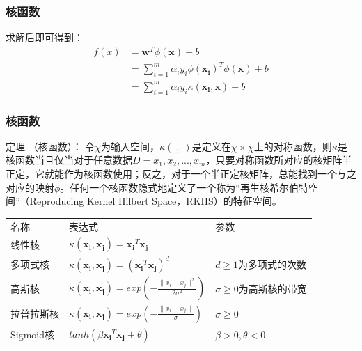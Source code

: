 \begin{frame}

\frametitle{核函数}

求解后即可得到：
\begin{align*}
f(x)&=\boldsymbol{w}^T\phi(\boldsymbol{x})+b\\
&=\sum_{i=1}^m\alpha_i y_i \phi(\boldsymbol{x_i})^T\phi(\boldsymbol{x})+b\\
&= \sum_{i=1}^m\alpha_i y_i \kappa(\boldsymbol{x_i, x}) + b
\end{align*}
\end{frame}


\begin{frame}

\frametitle{核函数}

定理 （核函数）：
令$\chi$为输入空间，$\kappa(\cdot,\cdot)$是定义在$\chi\times\chi$上的对称函数，则$\kappa$是核函数当且仅当对于任意数据$D={x_1,x_2,...,x_m}$，只要对称函数所对应的核矩阵半正定，它就能作为核函数使用；反之，对于一个半正定核矩阵，总能找到一个与之对应的映射$\phi$。任何一个核函数隐式地定义了一个称为“再生核希尔伯特空间”（Reproducing Kernel Hilbert Space，RKHS）的特征空间。

 \begin{table}[ht]

\begin{tabular}{l|l|l}

名称 & 表达式 & 参数\\  
线性核 &$\kappa(\boldsymbol{x_i,x_j})=\boldsymbol{x_i}^T\boldsymbol{x_j}$ &  \\ 
多项式核 &$\kappa(\boldsymbol{x_i,x_j})=(\boldsymbol{x_i}^T\boldsymbol{x_j})^d$ & $d\ge1$为多项式的次数 \\  
高斯核 & $\kappa(\boldsymbol{x_i,x_j})=exp(-\frac{\lVert x_i-x_j\rVert^2}{2\sigma^2})$ & $\sigma\ge0$为高斯核的带宽 \\  
拉普拉斯核 &  $\kappa(\boldsymbol{x_i,x_j})=exp(-\frac{\lVert x_i-x_j\rVert}{\sigma})$ &$\sigma\ge0$ \\  
Sigmoid核&$tanh(\beta\boldsymbol{x_i}^T\boldsymbol{x_j}+\theta)$ &$\beta>0,\theta<0$\\
\end{tabular}  
\end{table}

\end{frame}



